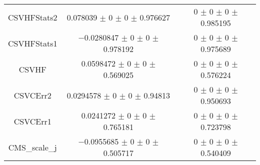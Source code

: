 \begin{table}
\begin{tabular}{ccc}
CSVHFStats2 	& \num{0.078039} $\pm$ \num{0} $\pm$ \num{0} $\pm$ \num{0.976627} 	& \num{0} $\pm$ \num{0} $\pm$ \num{0} $\pm$ \num{0.985195}\\
CSVHFStats1 	& \num{-0.0280847} $\pm$ \num{0} $\pm$ \num{0} $\pm$ \num{0.978192} 	& \num{0} $\pm$ \num{0} $\pm$ \num{0} $\pm$ \num{0.975689}\\
CSVHF 	& \num{0.0598472} $\pm$ \num{0} $\pm$ \num{0} $\pm$ \num{0.569025} 	& \num{0} $\pm$ \num{0} $\pm$ \num{0} $\pm$ \num{0.576224}\\
CSVCErr2 	& \num{0.0294578} $\pm$ \num{0} $\pm$ \num{0} $\pm$ \num{0.94813} 	& \num{0} $\pm$ \num{0} $\pm$ \num{0} $\pm$ \num{0.950693}\\
CSVCErr1 	& \num{0.0241272} $\pm$ \num{0} $\pm$ \num{0} $\pm$ \num{0.765181} 	& \num{0} $\pm$ \num{0} $\pm$ \num{0} $\pm$ \num{0.723798}\\
CMS\_scale\_j 	& \num{-0.0955685} $\pm$ \num{0} $\pm$ \num{0} $\pm$ \num{0.505717} 	& \num{0} $\pm$ \num{0} $\pm$ \num{0} $\pm$ \num{0.540409}\\
\bottomrule
\end{tabular}
\end{table}